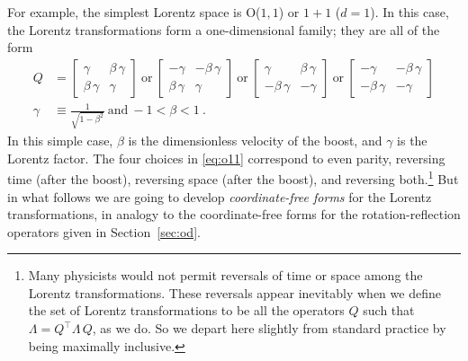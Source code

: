\documentclass{article}
\newcommand{\plus}{\!+\!} %
\newcommand{\secref}[1]{Section~\ref{#1}}
\begin{document}
For example, the simplest Lorentz space is O($1,1$) or $1\plus1$ ($d=1$).
In this case, the Lorentz transformations form a one-dimensional family; they are all of the form
\begin{align}
    Q &= \begin{bmatrix}\gamma & \beta\,\gamma \\ \beta\,\gamma & \gamma\end{bmatrix} ~\mbox{or}~
    \begin{bmatrix}-\gamma & -\beta\,\gamma \\ \beta\,\gamma & \gamma\end{bmatrix} ~\mbox{or}~
    \begin{bmatrix}\gamma & \beta\,\gamma \\ -\beta\,\gamma & -\gamma\end{bmatrix}  ~\mbox{or}~
    \begin{bmatrix}-\gamma & -\beta\,\gamma \\ -\beta\,\gamma & -\gamma\end{bmatrix} \label{eq:o11}
    \\
    \gamma &\equiv \frac{1}{\sqrt{1 - \beta^2}} ~ \mbox{and} ~ -1 < \beta < 1 ~.\nonumber
\end{align}
In this simple case, $\beta$ is the dimensionless velocity of the boost, and $\gamma$ is the Lorentz factor.
The four choices in \eqref{eq:o11} correspond to even parity, reversing time (after the boost), reversing space (after the boost), and reversing both.\footnote{%
Many physicists would not permit reversals of time or space among the Lorentz transformations.
These reversals appear inevitably when we define the set of Lorentz transformations to be all the operators $Q$ such that $\Lambda=Q^\top\Lambda\,Q$, as we do.
So we depart here slightly from standard practice by being maximally inclusive.}
But in what follows we are going to develop \emph{coordinate-free forms} for the Lorentz transformations, in analogy to the coordinate-free forms for the rotation-reflection operators given in \secref{sec:od}.
\end{document}
